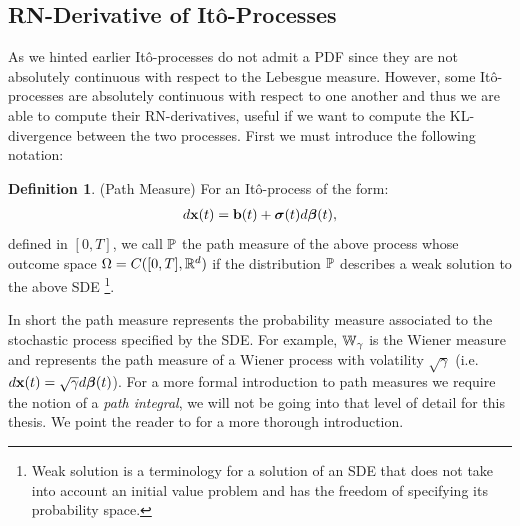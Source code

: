 \documentclass[a4paper,12pt,twoside,openright]{report}
\theoremstyle{definition}
\newtheorem{definition}{Definition}[section]
\begin{document}
\subsection{RN-Derivative of Itô-Processes}


As we hinted earlier Itô-processes do not admit a PDF since they are not absolutely continuous with respect to the Lebesgue measure. However, some Itô-processes are absolutely continuous with respect to one another and thus we are able to compute their RN-derivatives, useful if we want to compute the KL-divergence between the two processes.  First we must introduce the following notation:
\begin{definition} (Path Measure) \label{def:pathmesu}
    For an Itô-process of the form:
    \begin{align*}
        d\rvx(t) = \rvb(t) + \rvsigma(t) d\rvw(t),
    \end{align*}
    defined in $[0,T]$, we call $\P$ the path measure of the above process whose outcome space $\Omega=C([0,T], \R^d)$ if the distribution $\P$ describes a weak solution to the above SDE \footnote{Weak solution is a terminology for a solution of an SDE that does not take into account an initial value problem and has  the freedom of specifying its probability space.}.
\end{definition}

In short the path measure represents the probability measure associated to the stochastic process specified by the SDE.  For example, $\W_{\gamma}$ is the Wiener measure and represents the path measure of a Wiener process with volatility $\sqrt{\gamma}$
 (i.e. $d\rvx(t) = \sqrt{\gamma} d \rvw(t)$). For a more formal introduction to path measures we require the notion of a \textit{path integral}, we will not be going into that level of detail for this thesis. We point the reader to \cite{sarkka2019applied, oksendal2003stochastic} for a more thorough introduction.
 
\end{document}
